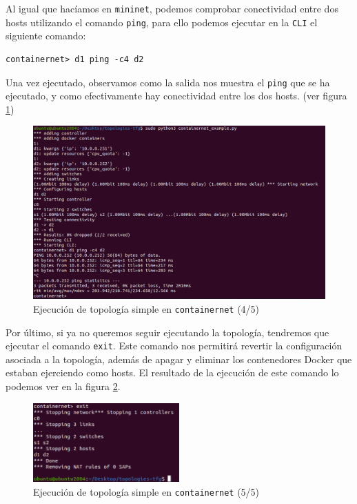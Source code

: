 \documentclass[a4paper, oneside, 12pt]{book}
\begin{document}
	\pagebreak

	\noindent Al igual que hacíamos en \texttt{mininet}, podemos comprobar conectividad entre dos hosts utilizando el comando \texttt{ping}, para ello podemos ejecutar en la \texttt{CLI} el siguiente comando:
	\begin{verbatim}
containernet> d1 ping -c4 d2
	\end{verbatim}

	\noindent Una vez ejecutado, observamos como la salida nos muestra el \texttt{ping} que se ha ejecutado, y como efectivamente hay conectividad entre los dos hosts. (ver figura \ref{img: cn simple 4})

	\begin{figure}[h!]
		\begin{center}
			\includegraphics[width=1\textwidth]{img/cn_example4.png}
			\caption{Ejecución de topología simple en \texttt{containernet} (4/5)}
			\label{img: cn simple 4}
		\end{center}
	\end{figure}

	\noindent Por último, si ya no queremos seguir ejecutando la topología, tendremos que ejecutar el comando \texttt{exit}. Este comando nos permitirá revertir la configuración asociada a la topología, además de apagar y eliminar los contenedores Docker que estaban ejerciendo como hosts. El resultado de la ejecución de este comando lo podemos ver en la figura \ref{img: cn simple 5}.

	\begin{figure}[h!]
		\begin{center}
			\includegraphics[width=0.5\textwidth]{img/cn_example5.png}
			\caption{Ejecución de topología simple en \texttt{containernet} (5/5)}
			\label{img: cn simple 5}
		\end{center}
	\end{figure}
	
\end{document}
